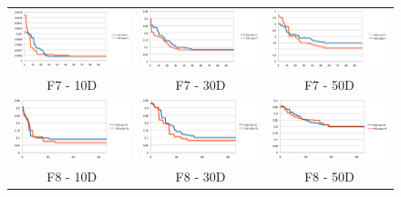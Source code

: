 \documentclass[final,1p,times]{elsarticle}
\begin{document}
\begin{figure}[!ht]
\begin{center}
\setlength{\tabcolsep}{2mm}
\renewcommand{\arraystretch}{1.2}
\begin{tabular}{ccc}

 \includegraphics[width=5cm]{f7d10.eps}  & \includegraphics[width=5cm]{f7d30.eps}  &  \includegraphics[width=5cm]{f7d50.eps}  \\
 
 F7 - 10D & F7 - 30D & F7 - 50D \\

 \includegraphics[width=5cm]{f8d10.eps}  & \includegraphics[width=5cm]{f8d30.eps}  &  \includegraphics[width=5cm]{f8d50.eps}  \\
 
 F8 - 10D & F8 - 30D & F8 - 50D \\
 

\end{tabular}
\end{center}
\end{figure}
\end{document}
